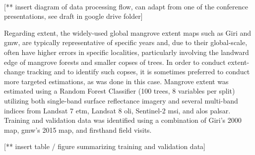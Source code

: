 \paragraph{} \label{sec:rio-mangrove-extent} \leavevmode\newline

[** insert diagram of data processing flow, can adapt from one of the conference presentations, see draft in google drive folder]

Regarding extent, the widely-used global mangrove extent maps such as Giri and \ac{gmw}, are typically representative of specific years and, due to their global-scale, often have higher errors in specific localities, particularly involving the landward edge of mangrove forests and smaller copses of trees. In order to conduct extent-change tracking and to identify such copses, it is sometimes preferred to conduct more targeted estimations, as was done in this case. Mangrove extent was estimated using a Random Forest Classifier (100 trees, 8 variables per split) utilizing both single-band surface reflectance imagery and several multi-band indices from Landsat 7 \ac{etm}, Landsat 8 \ac{oli}, Sentinel-2 \ac{msi}, and \ac{alos} \ac{palsar}. Training and validation data was identified using a combination of Giri's 2000 map, \ac{gmw}'s 2015 map, and firsthand field visits. 

[** insert table / figure summarizing training and validation data]

